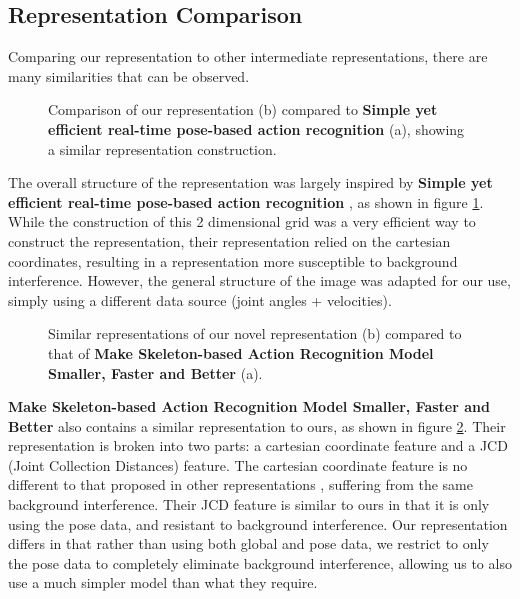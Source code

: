 \subsection{Representation Comparison}

Comparing our representation to other intermediate representations, there are many similarities that can be observed.

\begin{figure}[ht]
	\centering
	\caption{Comparison of our representation (b) compared to \textbf{Simple yet efficient real-time pose-based action recognition} \cite{simple_yet_efficient} (a), showing a similar representation construction.}
	\label{fig:simple-v-ours}
\end{figure}

The overall structure of the representation was largely inspired by \textbf{Simple yet efficient real-time pose-based action recognition} \cite{simple_yet_efficient}, as shown in figure \ref{fig:simple-v-ours}. While the construction of this 2 dimensional grid was a very efficient way to construct the representation, their representation relied on the cartesian coordinates, resulting in a representation more susceptible to background interference. However, the general structure of the image was adapted for our use, simply using a different data source (joint angles + velocities).

\begin{figure}[ht]
	\centering
	\caption{Similar representations of our novel representation (b) compared to that of \textbf{Make Skeleton-based Action Recognition Model Smaller, Faster and Better} \cite{smaller_faster_better} (a).}
	\label{fig:smaller-v-ours}
\end{figure}

\textbf{Make Skeleton-based Action Recognition Model Smaller, Faster and Better} \cite{smaller_faster_better} also contains a similar representation to ours, as shown in figure \ref{fig:smaller-v-ours}. Their representation is broken into two parts: a cartesian coordinate feature and a JCD (Joint Collection Distances) feature. The cartesian coordinate feature is no different to that proposed in other representations \cite{simple_yet_efficient}, suffering from the same background interference. Their JCD feature is similar to ours in that it is only using the pose data, and resistant to background interference. Our representation differs in that rather than using both global and pose data, we restrict to only the pose data to completely eliminate background interference, allowing us to also use a much simpler model than what they require.

